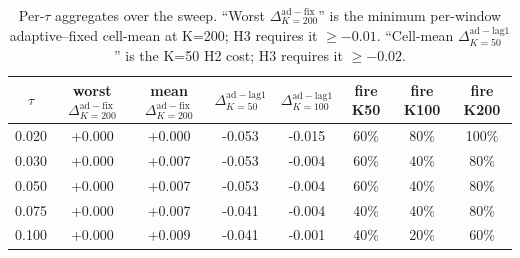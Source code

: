 \begin{table}[!t]
  \caption{Per-$\tau$ aggregates over the sweep. ``Worst $\Delta^{\mathrm{ad-fix}}_{K=200}$'' is the minimum per-window adaptive--fixed cell-mean at K=200; H3 requires it $\geq -0.01$. ``Cell-mean $\Delta^{\mathrm{ad-lag1}}_{K=50}$'' is the K=50 H2 cost; H3 requires it $\geq -0.02$.}
  \label{tab:per_tau}
  \centering
  \small
  \setlength{\tabcolsep}{6pt}
  \begin{tabular}{c cc cccc c}
    \toprule
    $\tau$ & worst $\Delta^{\mathrm{ad-fix}}_{K=200}$ & mean $\Delta^{\mathrm{ad-fix}}_{K=200}$ & $\Delta^{\mathrm{ad-lag1}}_{K=50}$ & $\Delta^{\mathrm{ad-lag1}}_{K=100}$ & fire K50 & fire K100 & fire K200 \\
    \midrule
    0.020 & +0.000 & +0.000 & -0.053 & -0.015 & 60\% & 80\% & 100\% \\
    0.030 & +0.000 & +0.007 & -0.053 & -0.004 & 60\% & 40\% & 80\% \\
    0.050 & +0.000 & +0.007 & -0.053 & -0.004 & 60\% & 40\% & 80\% \\
    0.075 & +0.000 & +0.007 & -0.041 & -0.004 & 40\% & 40\% & 80\% \\
    0.100 & +0.000 & +0.009 & -0.041 & -0.001 & 40\% & 20\% & 60\% \\
    \bottomrule
  \end{tabular}
\end{table}
